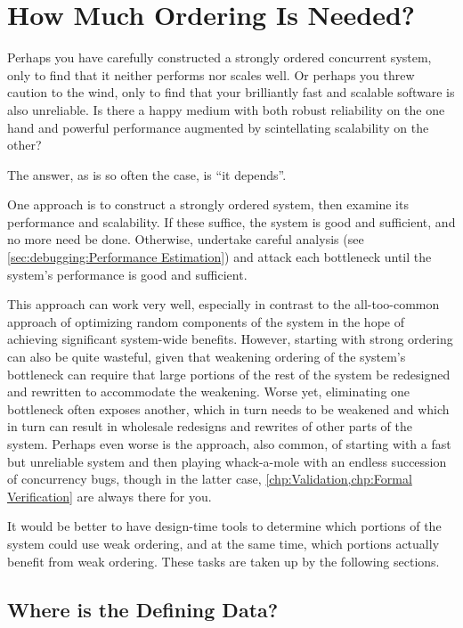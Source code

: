 
\section{How Much Ordering Is Needed?}
\label{sec:app:questions:How Much Ordering Is Needed?}

Perhaps you have carefully constructed a strongly ordered concurrent
system, only to find that it neither performs nor scales well.
Or perhaps you threw caution to the wind, only to find that your
brilliantly fast and scalable software is also unreliable.
Is there a happy medium with both robust reliability on the one
hand and powerful performance augmented by scintellating scalability on
the other?

The answer, as is so often the case, is ``it depends''.

One approach is to construct a strongly ordered system, then examine
its performance and scalability.
If these suffice, the system is good and sufficient, and no more need
be done.
Otherwise, undertake careful analysis
(see \cref{sec:debugging:Performance Estimation})
and attack each bottleneck until the system's performance is good and
sufficient.

This approach can work very well, especially in contrast to the
all-too-common approach of optimizing random components of the system
in the hope of achieving significant system-wide benefits.
However, starting with strong ordering can also be quite wasteful,
given that weakening ordering of the system's bottleneck can require
that large portions of the rest of the system be redesigned and
rewritten to accommodate the weakening.
Worse yet, eliminating one bottleneck often exposes another, which
in turn needs to be weakened and which in turn can result in wholesale
redesigns and rewrites of other parts of the system.
Perhaps even worse is the approach, also common, of starting with a
fast but unreliable system and then playing whack-a-mole with an endless
succession of concurrency bugs, though in the latter case,
\cref{chp:Validation,chp:Formal Verification}
are always there for you.

It would be better to have design-time tools to determine which portions
of the system could use weak ordering, and at the same time, which
portions actually benefit from weak ordering.
These tasks are taken up by the following sections.

\subsection{Where is the Defining Data?}
\label{sec:app:questions:Where is the Defining Data?}


